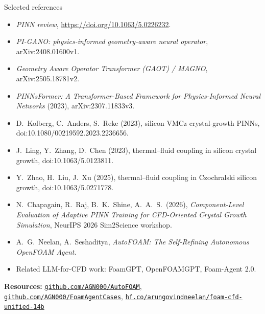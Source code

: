 \documentclass[aspectratio=169,10pt]{beamer}
\begin{document}
\begin{frame}{Selected references}
\scriptsize
\begin{itemize}\setlength{\itemsep}{1.5pt}
  \item \emph{PINN review}, \url{https://doi.org/10.1063/5.0226232}.
  \item \emph{PI-GANO: physics-informed geometry-aware neural operator}, arXiv:2408.01600v1.
  \item \emph{Geometry Aware Operator Transformer (GAOT) / MAGNO}, arXiv:2505.18781v2.
  \item \emph{PINNsFormer: A Transformer-Based Framework for Physics-Informed Neural Networks} (2023), arXiv:2307.11833v3.
  \item D.\ Kolberg, C.\ Anders, S.\ Reke (2023), silicon VMCz crystal-growth PINNs, doi:10.1080/00219592.2023.2236656.
  \item J.\ Ling, Y.\ Zhang, D.\ Chen (2023), thermal--fluid coupling in silicon crystal growth, doi:10.1063/5.0123811.
  \item Y.\ Zhao, H.\ Liu, J.\ Xu (2025), thermal--fluid coupling in Czochralski silicon growth, doi:10.1063/5.0271778.
  \item N.\ Chapagain, R.\ Raj, B.\ K.\ Shine, A.\ A.\ S.\ (2026), \emph{Component-Level Evaluation of Adaptive PINN Training for CFD-Oriented Crystal Growth Simulation}, NeurIPS 2026 Sim2Science workshop.
  \item A.\ G.\ Neelan, A.\ Seshaditya, \emph{AutoFOAM: The Self-Refining Autonomous OpenFOAM Agent}.
  \item Related LLM-for-CFD work: FoamGPT, OpenFOAMGPT, Foam-Agent 2.0.
\end{itemize}
\vspace{0.1cm}
\textbf{Resources:}
\href{https://github.com/AGN000/AutoFOAM}{\texttt{github.com/AGN000/AutoFOAM}},
\href{https://github.com/AGN000/FoamAgentCases}{\texttt{github.com/AGN000/FoamAgentCases}},
\href{https://huggingface.co/arungovindneelan/foam-cfd-unified-14b}{\texttt{hf.co/arungovindneelan/foam-cfd-unified-14b}}
\end{frame}
\end{document}
